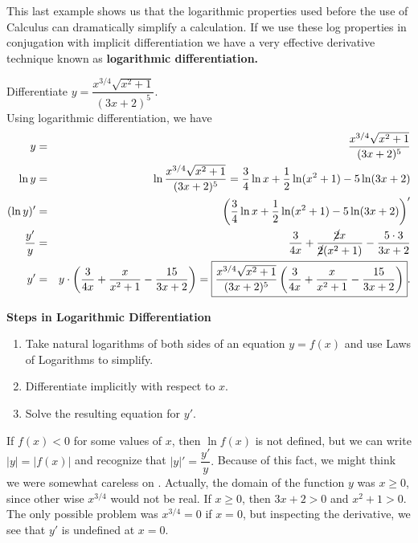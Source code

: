\documentclass{book}
\begin{document}
This last example shows us that the logarithmic properties used before the use of Calculus can dramatically simplify a calculation. If we use these log properties in conjugation with implicit differentiation we have a very effective derivative technique known as \textbf{logarithmic differentiation.}

\begin{Exam}\label{exam:log7} Differentiate $y = \dfrac{x^{3/4}\sqrt{x^2+1}}{(3x+2)^5}$.\\

Using logarithmic differentiation, we have 
\begin{eqnarray*} 
y &=& \dfrac{x^{3/4}\sqrt{x^2+1}}{(3x+2)^5}\\
\ln y &=& \ln \dfrac{x^{3/4}\sqrt{x^2+1}}{(3x+2)^5} = \frac{3}{4}\ln x + \frac{1}{2}\ln (x^2+1) - 5\ln (3x+2)\\
(\ln y)' &=& \left(\frac{3}{4}\ln x + \frac{1}{2}\ln (x^2+1) - 5\ln (3x+2)\right)'\\
\dfrac{y'}{y} &=& \dfrac{3}{4x} + \dfrac{\cancel{2}x}{\cancel{2}(x^2+1)} - \dfrac{5\cdot 3}{3x+2}\\
y' &=& y\cdot \left(\dfrac{3}{4x} + \dfrac{x}{x^2+1} - \dfrac{15}{3x+2}\right) = \fbox{$\dfrac{x^{3/4}\sqrt{x^2+1}}{(3x+2)^5}\left(\dfrac{3}{4x} + \dfrac{x}{x^2+1} - \dfrac{15}{3x+2}\right)$}. 
\end{eqnarray*}
\end{Exam}\vs

\textbf{Steps in Logarithmic Differentiation}

\begin{enumerate}[!THM!, start=1]
\item Take natural logarithms of both sides of an equation $y= f(x)$ and use Laws of Logarithms to simplify.
\item Differentiate implicitly with respect to $x$.
\item Solve the resulting equation for $y'$.\\
\end{enumerate}

If $f(x) < 0$ for some values of $x$, then $\ln f(x)$ is not defined, but we can write $|y| = |f(x)|$ and recognize that $|y|' = \dfrac{y'}{y}.$ Because of this fact, we might think we were somewhat careless on . Actually, the domain of the function $y$ was $x \ge 0$, since other wise $x^{3/4}$ would not be real. If $x \ge 0$, then $3x+2 > 0$ and $x^2+1 > 0$. The only possible problem was $x^{3/4} = 0$ if $x=0$, but inspecting the derivative, we see that $y'$ is undefined at $x=0.$
\end{document}
